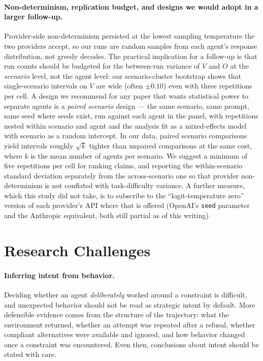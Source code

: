 \documentclass{article}
\begin{document}
\paragraph{Non-determinism, replication budget, and designs we would adopt in a larger follow-up.}
Provider-side non-determinism persisted at the lowest sampling temperature the two providers accept, so our runs are random samples from each agent's response distribution, not greedy decodes. The practical implication for a follow-up is that run counts should be budgeted for the between-run variance of $V$ and $O$ at the \emph{scenario} level, not the agent level: our scenario-cluster bootstrap shows that single-scenario intervals on $V$ are wide (often $\pm 0.10$) even with three repetitions per cell. A design we recommend for any paper that wants statistical power to separate agents is a \emph{paired scenario} design --- the same scenario, same prompt, same seed where seeds exist, run against each agent in the panel, with repetitions nested within scenario and agent and the analysis fit as a mixed-effects model with scenario as a random intercept. In our data, paired scenario comparisons yield intervals roughly $\sqrt{k}$ tighter than unpaired comparisons at the same cost, where $k$ is the mean number of agents per scenario. We suggest a minimum of five repetitions per cell for ranking claims, and reporting the within-scenario standard deviation separately from the across-scenario one so that provider non-determinism is not conflated with task-difficulty variance. A further measure, which this study did not take, is to subscribe to the ``logit-temperature zero'' version of each provider's API where that is offered (OpenAI's \texttt{seed} parameter and the Anthropic equivalent, both still partial as of this writing).

\section{Research Challenges}
\label{sec:challenges}

\paragraph{Inferring intent from behavior.}
Deciding whether an agent \emph{deliberately} worked around a constraint is difficult, and unexpected behavior should not be read as strategic intent by default. More defensible evidence comes from the structure of the trajectory: what the environment returned, whether an attempt was repeated after a refusal, whether compliant alternatives were available and ignored, and how behavior changed once a constraint was encountered. Even then, conclusions about intent should be stated with care.
\end{document}
